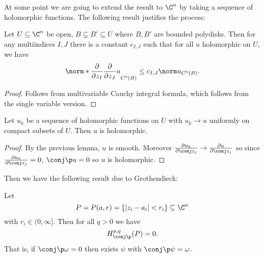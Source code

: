 \documentclass[a4paper]{article}
\begin{document}
At some point we are going to extend the result to \(\C^n\) by taking a sequence of holomorphic functions. The following result justifies the process:

\begin{lemma}
  Let \(U \subseteq \C^n\) be open, \(B \subsetneq B' \subseteq U\) where \(B, B'\) are bounded polydisks. Then for any multiindices \(I, J\) there is a constant \(c_{I, J}\) such that for all \(u\) holomorphic on \(U\), we have
  \[
    \norm*{\frac{\partial  }{\partial z_I} \frac{\partial  }{\partial z_J} u}_{C^0(B)} \leq c_{I, J} \norm u_{C^0(B)}.
  \]
\end{lemma}

\begin{proof}
  Follows from multivariable Cauchy integral formula, which follows from the single variable version.
\end{proof}

\begin{corollary}
  Let \(u_k\) be a sequence of holomorphic functions on \(U\) with \(u_k \to u\) uniformly on compact subsets of \(U\). Then \(u\) is holomorphic.
\end{corollary}

\begin{proof}
  By the previous lemma, \(u\) is smooth. Moreover \(\frac{\partial u_k}{\partial \conj z_j} \to \frac{\partial u}{\partial \conj z_j}\) so since \(\frac{\partial u_k}{\partial \conj z_j} = 0\), \(\conj \p u = 0\) so \(u\) is holomorphic.
\end{proof}

Then we have the following result due to Grothendieck:

\begin{theorem}
  Let
  \[
    P = P(a, r) = \{|z_i - a_i| < r_i\} \subseteq \C^n
  \]
  with \(r_i \in (0, \infty]\). Then for all \(q > 0\) we have
  \[
    H_{\conj \p}^{p, q}(P) = 0.
  \]
  That is, if \(\conj \p \omega = 0\) then exists \(\psi\) with \(\conj \p \psi = \omega\).
\end{theorem}
\end{document}
